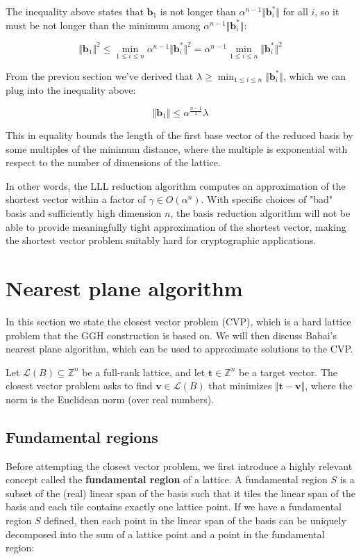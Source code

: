 \documentclass[letterpaper,12pt]{article}
\begin{document}
The inequality above states that $\mathbf{b}_1$ is not longer than $\alpha^{n-1} \Vert \mathbf{b}_{i}^\ast \Vert$ for all $i$, so it must be not longer than the minimum among $\alpha^{n-1} \Vert \mathbf{b}_{i}^\ast \Vert$:

$$
\Vert \mathbf{b}_1 \Vert^2 \leq \min_{1 \leq i \leq n}\alpha^{n-1} \Vert \mathbf{b}_{i}^\ast \Vert^2 = \alpha^{n-1} \min_{1 \leq i \leq n}\Vert \mathbf{b}_{i}^\ast \Vert^2
$$

From the previou section we've derived that $\lambda \geq \min_{1 \leq i \leq n} \Vert \mathbf{b}_i^\ast \Vert$, which we can plug into the inequality above:

$$
\Vert \mathbf{b}_1 \Vert \leq \alpha^\frac{n-1}{2} \lambda
$$

This in equality bounds the length of the first base vector of the reduced basis by some multiples of the minimum distance, where the multiple is exponential with respect to the number of dimensions of the lattice.

In other words, the LLL reduction algorithm computes an approximation of the shortest vector within a factor of $\gamma \in O(\alpha^n)$. With specific choices of "bad" basis and sufficiently high dimension $n$, the basis reduction algorithm will not be able to provide meaningfully tight approximation of the shortest vector, making the shortest vector problem suitably hard for cryptographic applications.


\section{Nearest plane algorithm}
In this section we state the closest vector problem (CVP), which is a hard lattice problem that the GGH construction is based on. We will then discuss Babai's nearest plane algorithm, which can be used to approximate solutions to the CVP.

Let $\mathcal{L}(B) \subseteq \mathbb{Z}^n$ be a full-rank lattice, and let $\mathbf{t} \in \mathbb{Z}^n$ be a target vector. The closest vector problem asks to find $\mathbf{v} \in \mathcal{L}(B)$ that minimizes $\Vert \mathbf{t} - \mathbf{v} \Vert$, where the norm is the Euclidean norm (over real numbers).

\subsection{Fundamental regions}
Before attempting the closest vector problem, we first introduce a highly relevant concept called the \textbf{fundamental region} of a lattice. A fundamental region $S$ is a subset of the (real) linear span of the basis such that it tiles the linear span of the basis and each tile contains exactly one lattice point. If we have a fundamental region $S$ defined, then each point in the linear span of the basis can be uniquely decomposed into the sum of a lattice point and a point in the fundamental region:
\end{document}
